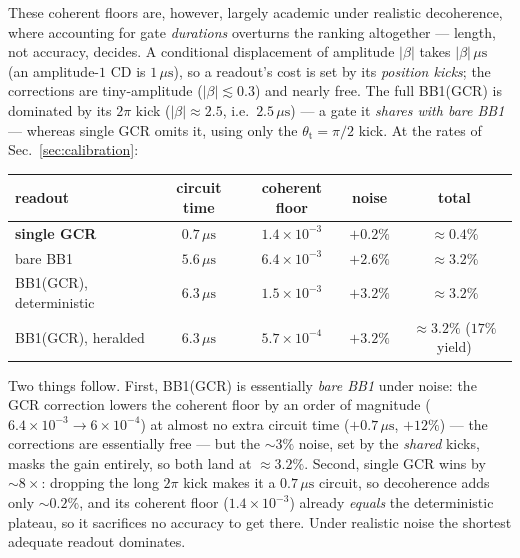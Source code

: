 \documentclass[11pt]{article}
\begin{document}
These coherent floors are, however, largely academic under realistic decoherence, where accounting for
gate \emph{durations} overturns the ranking altogether --- length, not accuracy, decides. A
conditional displacement of amplitude $|\beta|$ takes $|\beta|\,\mu\mathrm{s}$ (an amplitude-$1$ CD is
$1\,\mu\mathrm{s}$), so a readout's cost is set by its \emph{position kicks}; the corrections are
tiny-amplitude ($|\beta|\lesssim0.3$) and nearly free. The full BB1(GCR) is dominated by its $2\pi$ kick
($|\beta|\!\approx\!2.5$, i.e.\ $2.5\,\mu\mathrm{s}$) --- a gate it \emph{shares with bare BB1} ---
whereas single GCR omits it, using only the $\theta_\mathrm{t}=\pi/2$ kick. At the rates of
Sec.~\ref{sec:calibration}:
\begin{center}
\begin{tabular}{lcccc}
\toprule
readout & circuit time & coherent floor & noise & total\\
\midrule
\textbf{single GCR} & $0.7\,\mu\mathrm{s}$ & $1.4\times10^{-3}$ & $+0.2\%$ & $\boldsymbol{\approx0.4\%}$\\
bare BB1 & $5.6\,\mu\mathrm{s}$ & $6.4\times10^{-3}$ & $+2.6\%$ & $\approx3.2\%$\\
BB1(GCR), deterministic & $6.3\,\mu\mathrm{s}$ & $1.5\times10^{-3}$ & $+3.2\%$ & $\approx3.2\%$\\
BB1(GCR), heralded & $6.3\,\mu\mathrm{s}$ & $5.7\times10^{-4}$ & $+3.2\%$ & $\approx3.2\%$ ($17\%$ yield)\\
\bottomrule
\end{tabular}
\end{center}
Two things follow. First, BB1(GCR) is essentially \emph{bare BB1} under noise: the GCR correction
lowers the coherent floor by an order of magnitude ($6.4\times10^{-3}\!\to\!6\times10^{-4}$) at almost
no extra circuit time ($+0.7\,\mu\mathrm{s}$, $+12\%$) --- the corrections are essentially free --- but
the $\sim\!3\%$ noise, set by the \emph{shared} kicks, masks the gain entirely, so both land at
$\approx3.2\%$. Second, single GCR wins by $\sim\!8\times$: dropping the long $2\pi$ kick makes it a
$0.7\,\mu\mathrm{s}$ circuit, so decoherence adds only $\sim\!0.2\%$, and its coherent floor
($1.4\times10^{-3}$) already \emph{equals} the deterministic plateau, so it sacrifices no accuracy to
get there. Under realistic noise the shortest adequate readout dominates.
\end{document}
